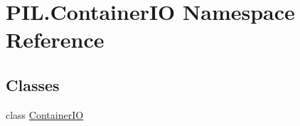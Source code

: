 \hypertarget{namespacePIL_1_1ContainerIO}{}\section{P\+I\+L.\+Container\+IO Namespace Reference}
\label{namespacePIL_1_1ContainerIO}
\subsection*{Classes}
\begin{DoxyCompactItemize}
\item 
class \hyperlink{classPIL_1_1ContainerIO_1_1ContainerIO}{Container\+IO}
\end{DoxyCompactItemize}
